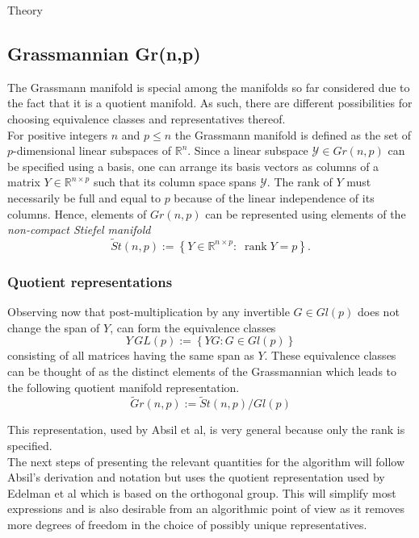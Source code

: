 \begin{chapter}{Theory}
\subsection{Grassmannian Gr(n,p)} %
\label{sub:Grassmanian}
The Grassmann manifold is special among the manifolds so far considered due to the fact that it is a quotient manifold. 
As such, there are different possibilities for choosing equivalence classes and representatives thereof.\\

For positive integers $n$ and $p\leq n$ the Grassmann manifold is defined as the set of $p$-dimensional linear subspaces of $\mathbb{R}^n$. 
Since a linear subspace $\mathcal{Y}\in Gr(n,p)$ can be specified using a basis, one can arrange its basis vectors as columns of
a matrix $Y\in\mathbb{R}^{n\times p}$ such that its column space spans $\mathcal{Y}$. The rank of $Y$ must necessarily be full and equal to $p$ because of the linear independence
of its columns. Hence, elements of $Gr(n,p)$ can be represented using elements of the \emph{non-compact Stiefel manifold}
\begin{equation}
    \tilde St(n,p) := \left\lbrace Y\in\mathbb{R}^{n\times p}:\; \operatorname{rank}Y=p\right\rbrace.
\end{equation}

\subsubsection{Quotient representations} %
\label{ssub:Quotient representations}
Observing now that post-multiplication by any invertible $G\in Gl(p)$ does not change the span of $Y$, can form the equivalence classes
\begin{equation}
    Y\,GL(p) := \left\lbrace YG: G\in Gl(p)\right\rbrace
\end{equation}
consisting of all matrices having the same span as $Y$. These equivalence classes can be thought of as the distinct elements of the Grassmannian which
leads to the following quotient manifold representation.\\
\begin{equation}
    \tilde Gr(n,p):=\tilde St(n,p) / Gl(p)
\end{equation}

This representation, used by Absil et al\cite{AbsilGrassmann}, is very general because only the rank is specified.\\

The next steps of presenting the relevant quantities for the
algorithm will follow Absil's derivation and notation but uses the quotient representation used by Edelman et al \cite{EAS} which is based on the orthogonal group. This will simplify most expressions and is also desirable from an algorithmic point of view as it removes more degrees of freedom in the choice of possibly unique representatives.\\


\end{chapter}
